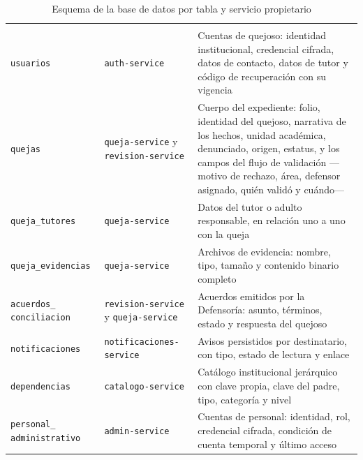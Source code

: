 	\begin{longtable}{|p{3.5cm}|p{3.1cm}|p{7.5cm}|}
		\caption{Esquema de la base de datos por tabla y servicio propietario}
		\label{tab:esquema_bd} \\
		\hline
		\rowcolor{headerblue}
		\headercell{Tabla} & \headercell{Propietario} & \headercell{Contenido} \\
		\hline
		\endfirsthead
	
		\hline
		\rowcolor{headerblue}
		\headercell{Tabla} & \headercell{Propietario} & \headercell{Contenido} \\
		\hline
		\endhead
	
		\texttt{usuarios} & \texttt{auth-service} & Cuentas de quejoso: identidad institucional,
		credencial cifrada, datos de contacto, datos de tutor y código de recuperación con su
		vigencia \\ \hline
	
		\texttt{quejas} & \texttt{queja-service} y \texttt{revision-\allowbreak service} & Cuerpo del expediente:
		folio, identidad del quejoso, narrativa de los hechos, unidad académica, denunciado, origen,
		estatus, y los campos del flujo de validación ---motivo de rechazo, área, defensor asignado,
		quién validó y cuándo--- \\ \hline
	
		\texttt{queja\_tutores} & \texttt{queja-service} & Datos del tutor o adulto responsable,
		en relación uno a uno con la queja \\ \hline
	
		\texttt{queja\_evidencias} & \texttt{queja-service} & Archivos de evidencia: nombre, tipo,
		tamaño y contenido binario completo \\ \hline
	
		\texttt{acuerdos\_} \texttt{conciliacion} & \texttt{revision-\allowbreak service} y
		\texttt{queja-service} & Acuerdos emitidos por la Defensoría: asunto, términos, estado y
		respuesta del quejoso \\ \hline
	
		\texttt{notificaciones} & \texttt{notificaciones-} \texttt{service} & Avisos persistidos por
		destinatario, con tipo, estado de lectura y enlace \\ \hline
	
		\texttt{dependencias} & \texttt{catalogo-\allowbreak service} & Catálogo institucional jerárquico con
		clave propia, clave del padre, tipo, categoría y nivel \\ \hline
	
		\texttt{personal\_} \texttt{administrativo} & \texttt{admin-service} & Cuentas de personal:
		identidad, rol, credencial cifrada, condición de cuenta temporal y último acceso \\ \hline
	

\end{longtable}
